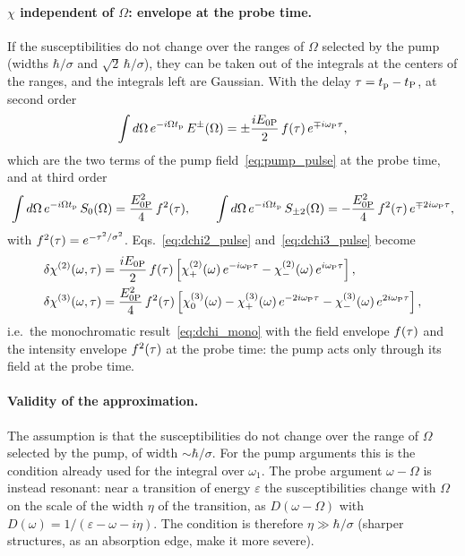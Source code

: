\documentclass[10pt,a4paper]{paper}
\begin{document}
\paragraph{$\chi$ independent of $\Omega$: envelope at the probe time.} If the susceptibilities do not change over the
ranges of $\Omega$ selected by the pump (widths $\hbar/\sigma$ and $\sqrt{2}\,\hbar/\sigma$), they can be taken out of the integrals at the centers of the
ranges, and the integrals left are Gaussian. With the delay $\tau = t_{\mathrm{p}}-t_{\mathrm{P}}$, at second order
\begin{equation}
\int d\Omega\,e^{-i\Omega t_{\mathrm{p}}}\,E^\pm(\Omega) = \pm\frac{iE_{0\mathrm{P}}}{2}\,f(\tau)\,e^{\mp i\omega_{\mathrm{P}}\tau} ,
\end{equation}
which are the two terms of the pump field~\eqref{eq:pump_pulse} at the probe time, and at third order
\begin{equation}
\int d\Omega\,e^{-i\Omega t_{\mathrm{p}}}\,S_0(\Omega) = \frac{E_{0\mathrm{P}}^2}{4}\,f^2(\tau) , \qquad
\int d\Omega\,e^{-i\Omega t_{\mathrm{p}}}\,S_{\pm2}(\Omega) = -\frac{E_{0\mathrm{P}}^2}{4}\,f^2(\tau)\,e^{\mp2i\omega_{\mathrm{P}}\tau} ,
\end{equation}
with $f^2(\tau) = e^{-\tau^2/\sigma^2}$. Eqs.~\eqref{eq:dchi2_pulse} and~\eqref{eq:dchi3_pulse} become
\begin{align}
\delta\chi^{(2)}(\omega,\tau) &= \frac{iE_{0\mathrm{P}}}{2}\,f(\tau)\left[\chi^{(2)}_+(\omega)\,e^{-i\omega_{\mathrm{P}}\tau}
- \chi^{(2)}_-(\omega)\,e^{i\omega_{\mathrm{P}}\tau}\right] , \nonumber\\
\delta\chi^{(3)}(\omega,\tau) &= \frac{E_{0\mathrm{P}}^2}{4}\,f^2(\tau)\left[\chi^{(3)}_{0}(\omega) - \chi^{(3)}_{+}(\omega)\,e^{-2i\omega_{\mathrm{P}}\tau}
- \chi^{(3)}_{-}(\omega)\,e^{2i\omega_{\mathrm{P}}\tau}\right] ,
\label{eq:dchi_probetime}
\end{align}
i.e.\ the monochromatic result~\eqref{eq:dchi_mono} with the field envelope $f(\tau)$ and the intensity envelope
$f^2(\tau)$ at the probe time: the pump acts only through its field at the probe time.

\paragraph{Validity of the approximation.} The assumption is that the susceptibilities do not change over the range of
$\Omega$ selected by the pump, of width $\sim\hbar/\sigma$. For the pump arguments this is the condition already used
for the integral over $\omega_1$. The probe argument $\omega-\Omega$ is instead resonant: near a transition of energy
$\varepsilon$ the susceptibilities change with $\Omega$ on the scale of the width $\eta$ of the transition, as
$D(\omega-\Omega)$ with $D(\omega) = 1/(\varepsilon-\omega-i\eta)$. The condition is therefore $\eta\gg\hbar/\sigma$
(sharper structures, as an absorption edge, make it more severe).
\end{document}
